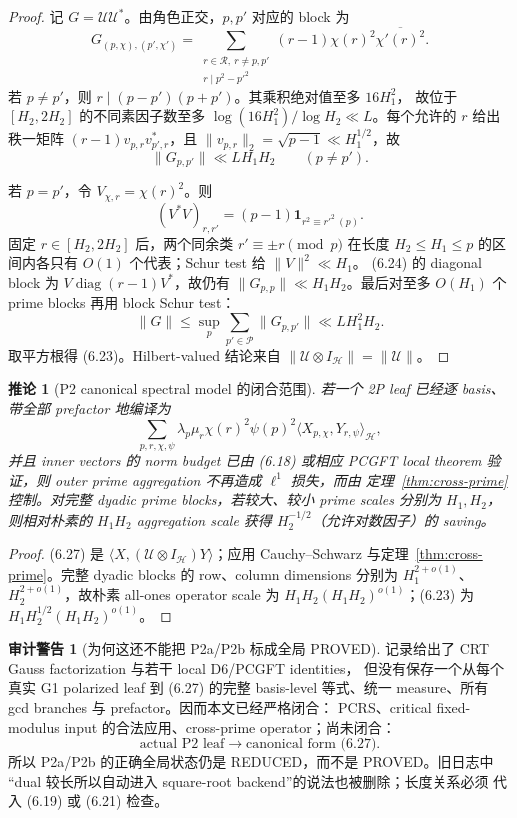 \documentclass[11pt,a4paper]{ctexart}
\newtheorem{corollary}[theorem]{推论}
\theoremstyle{definition}
\newtheorem{warning}[theorem]{审计警告}
\newcommand{\1}{\mathbf 1}
\newcommand{\REDUCED}{\textcolor{orange!80!black}{\textsf{REDUCED}}}
\begin{document}
\begin{proof}
记 $G=\mathscr U\mathscr U^*$。由角色正交，$p,p'$ 对应的 block 为
\[
G_{(p,\chi),(p',\chi')}
=\sum_{\substack{r\in\mathcal R,\ r\ne p,p'\\r\mid p^2-p'^2}}
(r-1)\chi(r)^2\overline{\chi'(r)^2}.                  \tag{6.24}
\]
若 $p\ne p'$，则 $r\mid(p-p')(p+p')$。其乘积绝对值至多 $16H_1^2$，
故位于 $[H_2,2H_2]$ 的不同素因子数至多
$\log(16H_1^2)/\log H_2\ll L$。每个允许的 $r$ 给出秩一矩阵
\((r-1)v_{p,r}v_{p',r}^*\)，且
$\|v_{p,r}\|_2=\sqrt{p-1}\ll H_1^{1/2}$，故
\[
\|G_{p,p'}\|\ll LH_1H_2\qquad(p\ne p').            \tag{6.25}
\]

若 $p=p'$，令 $V_{\chi,r}=\chi(r)^2$。则
\[
(V^*V)_{r,r'}=(p-1)\mathbf1_{r^2\equiv r'^2\ (p)}.  \tag{6.26}
\]
固定 $r\in[H_2,2H_2]$ 后，两个同余类 $r'\equiv\pm r\pmod p$ 在长度
$H_2\le H_1\le p$ 的区间内各只有 $O(1)$ 个代表；Schur test 给
$\|V\|^2\ll H_1$。
(6.24) 的 diagonal block 为 $V\operatorname{diag}(r-1)V^*$，故仍有
$\|G_{p,p}\|\ll H_1H_2$。最后对至多 $O(H_1)$ 个 prime blocks 再用
block Schur test：
\[
\|G\|\le\sup_p\sum_{p'\in\mathcal P}\|G_{p,p'}\|
\ll LH_1^2H_2.
\]
取平方根得 (6.23)。Hilbert-valued 结论来自
$\|\mathscr U\otimes I_{\mathcal H}\|=\|\mathscr U\|$。
\end{proof}

\begin{corollary}[P2 canonical spectral model 的闭合范围]
若一个 2P leaf 已经逐 basis、带全部 prefactor 地编译为
\[
\sum_{p,r,\chi,\psi}
\lambda_p\mu_r\chi(r)^2\psi(p)^2
\langle X_{p,\chi},Y_{r,\psi}\rangle_{\mathcal H},   \tag{6.27}
\]
并且 inner vectors 的 norm budget 已由 (6.18) 或相应 PCGFT local theorem
验证，则 outer prime aggregation 不再造成 $\ell^1$ 损失，而由
定理~\ref{thm:cross-prime} 控制。对完整 dyadic prime blocks，若较大、较小
prime scales 分别为 $H_1,H_2$，则相对朴素的 $H_1H_2$ aggregation scale
获得 $H_2^{-1/2}$（允许对数因子）的 saving。
\end{corollary}

\begin{proof}
(6.27) 是
$\langle X,(\mathscr U\otimes I_{\mathcal H})Y\rangle$；应用
Cauchy--Schwarz 与定理~\ref{thm:cross-prime}。完整 dyadic blocks 的 row、column
dimensions 分别为 $H_1^{2+o(1)}$、$H_2^{2+o(1)}$，故朴素 all-ones
operator scale 为 $H_1H_2(H_1H_2)^{o(1)}$；(6.23) 为
$H_1H_2^{1/2}(H_1H_2)^{o(1)}$。
\end{proof}

\begin{warning}[为何这还不能把 P2a/P2b 标成全局 PROVED]
记录给出了 CRT Gauss factorization 与若干 local D6/PCGFT identities，
但没有保存一个从每个真实 G1 polarized leaf 到 (6.27) 的完整 basis-level
等式、统一 measure、所有 gcd branches 与 prefactor。因而本文已经严格闭合：
PCRS、critical fixed-modulus input 的合法应用、cross-prime operator；尚未闭合：
\[
\boxed{
\text{actual P2 leaf}\longrightarrow\text{canonical form (6.27)}.}   \tag{6.28}
\]
所以 P2a/P2b 的正确全局状态仍是 \REDUCED，而不是 PROVED。旧日志中
“dual 较长所以自动进入 square-root backend”的说法也被删除；长度关系必须
代入 (6.19) 或 (6.21) 检查。
\end{warning}
\end{document}
